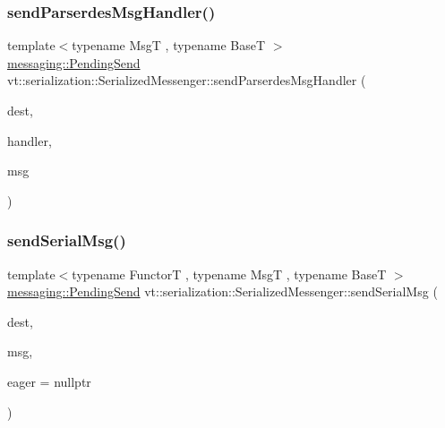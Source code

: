 \mbox{\label{structvt_1_1serialization_1_1_serialized_messenger_a2e66982b0bcb6c2b15d4911d0609f8c7}} 
\subsubsection{\texorpdfstring{send\+Parserdes\+Msg\+Handler()}{sendParserdesMsgHandler()}}
{\footnotesize\ttfamily template$<$typename MsgT , typename BaseT $>$ \\
\hyperlink{structvt_1_1messaging_1_1_pending_send}{messaging\+::\+Pending\+Send} vt\+::serialization\+::\+Serialized\+Messenger\+::send\+Parserdes\+Msg\+Handler (\begin{DoxyParamCaption}\item[{\hyperlink{namespacevt_a866da9d0efc19c0a1ce79e9e492f47e2}{Node\+Type}}]{dest,  }\item[{\hyperlink{namespacevt_af64846b57dfcaf104da3ef6967917573}{Handler\+Type} const \&}]{handler,  }\item[{MsgT $\ast$}]{msg }\end{DoxyParamCaption})\hspace{0.3cm}{\ttfamily [static]}}

\mbox{\label{structvt_1_1serialization_1_1_serialized_messenger_a85c14495a73a8b14588e358d9024bb42}} 
\subsubsection{\texorpdfstring{send\+Serial\+Msg()}{sendSerialMsg()}\hspace{0.1cm}{\footnotesize\ttfamily [1/3]}}
{\footnotesize\ttfamily template$<$typename FunctorT , typename MsgT , typename BaseT $>$ \\
\hyperlink{structvt_1_1messaging_1_1_pending_send}{messaging\+::\+Pending\+Send} vt\+::serialization\+::\+Serialized\+Messenger\+::send\+Serial\+Msg (\begin{DoxyParamCaption}\item[{\hyperlink{namespacevt_a866da9d0efc19c0a1ce79e9e492f47e2}{Node\+Type}}]{dest,  }\item[{MsgT $\ast$}]{msg,  }\item[{\hyperlink{namespacevt_1_1serialization_a009aa1de8d42a3c97643b947fcc6f0b6}{Action\+Eager\+Send}$<$ MsgT, BaseT $>$}]{eager = {\ttfamily nullptr} }\end{DoxyParamCaption})\hspace{0.3cm}{\ttfamily [static]}}

